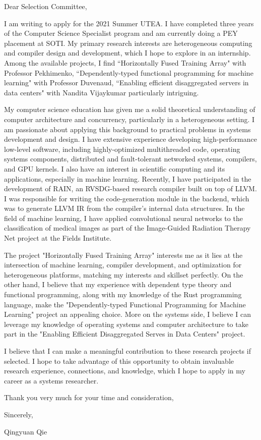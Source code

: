 \documentclass[11pt]{article}
\begin{document}
\setlength{\parindent}{0em}
\setlength{\parskip}{1em}
\noindent
Dear Selection Committee,

\vspace{5mm}

I am writing to apply for the 2021 Summer UTEA. I have completed three years of the Computer Science Specialist program and am currently doing a PEY placement at SOTI. My primary research interests are heterogeneous computing and compiler design and development, which I hope to explore in an internship. Among the available projects, I find ``Horizontally Fused Training Array" with Professor Pekhimenko, ``Dependently-typed functional programming for machine learning" with Professor Duvenaud, ``Enabling efficient disaggregated servers in data centers" with Nandita Vijaykumar particularly intriguing.

My computer science education has given me a solid theoretical understanding of computer architecture and concurrency, particularly in a heterogeneous setting. I am passionate about applying this background to practical problems in systems development and design. I have extensive experience developing high-performance low-level software, including highly-optimized multithreaded code, operating systems components, distributed and fault-tolerant networked systems, compilers, and GPU kernels. I also have an interest in scientific computing and its applications, especially in machine learning. Recently, I have participated in the development of RAIN, an RVSDG-based research compiler built on top of LLVM. I was responsible for writing the code-generation module in the backend, which was to generate LLVM IR from the compiler's internal data structures. In the field of machine learning, I have applied convolutional neural networks to the classification of medical images as part of the Image-Guided Radiation Therapy Net project at the Fields Institute.

The project "Horizontally Fused Training Array" interests me as it lies at the intersection of machine learning, compiler development, and optimization for heterogeneous platforms, matching my interests and skillset perfectly. On the other hand, I believe that my experience with dependent type theory and functional programming, along with my knowledge of the Rust programming language, make the "Dependently-typed Functional Programming for Machine Learning" project an appealing choice. More on the systems side, I believe I can leverage my knowledge of operating systems and computer architecture to take part in the "Enabling Efficient Disaggregated Serves in Data Centers" project.

I believe that I can make a meaningful contribution to these research projects if selected. I hope to take advantage of this opportunity to obtain invaluable research experience, connections, and knowledge, which I hope to apply in my career as a systems researcher.

\vspace{5mm}
\noindent
Thank you very much for your time and consideration,

\vspace{5mm}
\noindent
Sincerely,

\noindent
Qingyuan Qie
\end{document}

